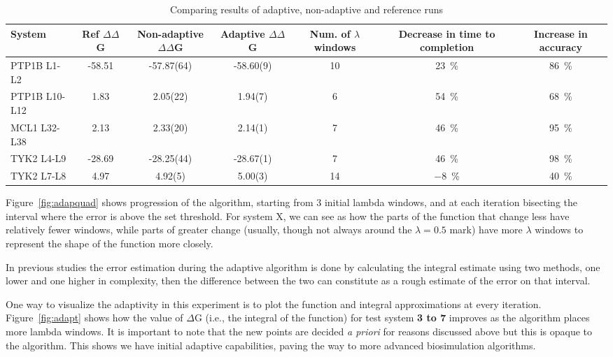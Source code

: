 \begin{table}
  \caption{Comparing results of adaptive, non-adaptive and reference runs}
  \label{tab:adapquad}
  \begin{tabular}{lSSSSSS}
    \toprule
    {System}                               & 
    {Ref $\Delta \Delta$G}                 &
    {Non-adaptive $\Delta \Delta$G}        &
    {Adaptive $\Delta \Delta$G}            &
    {Num. of $\lambda$ windows}            &
    {Decrease in time to completion}       &
    {Increase in accuracy}                 \\
    \midrule
    {PTP1B L1-L2}   & 
    -58.51 & 
    -57.87(64) & 
    -58.60(9) & 
    10 & 
    \SI{23}{\percent} & 
    \SI{86}{\percent} \\
    {PTP1B L10-L12} & 
    1.83   & 
    2.05(22) & 
    1.94(7)  & 
    6  & 
    \SI{54}{\percent} &
    \SI{68}{\percent} \\
    {MCL1  L32-L38} & 
    2.13   & 
    2.33(20) & 
    2.14(1)      & 
    7  & 
    \SI{46}{\percent} & 
    \SI{95}{\percent} \\
    {TYK2  L4-L9}   &
    -28.69 & 
    -28.25(44) & 
    -28.67(1)  & 
    7  & 
    \SI{46}{\percent} & 
    \SI{98}{\percent} \\
    {TYK2  L7-L8}   & 
    4.97   & 
    4.92(5) & 
    5.00(3)      & 
    14 &  
    \SI{-8}{\percent} & 
    \SI{40}{\percent} \\
    \bottomrule 
    
  \end{tabular}
\end{table}

Figure~\ref{fig:adapquad} shows progression of the algorithm, starting from 3
initial lambda windows, and at each iteration bisecting the interval where
the error is above the set threshold. For system X, we can see as how the
parts of the function that change less have relatively fewer windows, while
parts of greater change (usually, though not always around the $\lambda=0.5$
mark) have more $\lambda$ windows to represent the shape of the function more
closely.

 In previous studies \cite{} the
error estimation during the adaptive algorithm is done by calculating the
integral estimate using two methods, one lower and one higher in complexity,
then the difference between the two can constitute as a rough estimate of the
error on that interval.

One way to visualize the adaptivity in this experiment is to plot the
function and integral approximations at every iteration.
Figure~\ref{fig:adapt} shows how the value of $\Delta$G (i.e., the integral
of the function) for test system \textbf{3 to 7}  improves as the
algorithm places more lambda windows. It is important to note that the new
points are decided {\it a priori} for reasons discussed above but this is
opaque to the algorithm. This shows we have initial adaptive capabilities,
paving the way to more advanced biosimulation algorithms.

